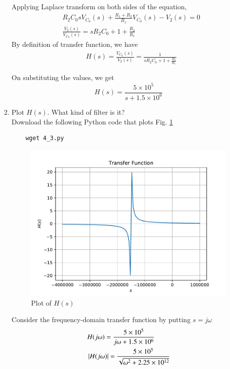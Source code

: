 \documentclass[journal,12pt,twocolumn]{IEEEtran}
\renewcommand\thesection{\arabic{section}}
\begin{document}
\begin{enumerate}[label=\arabic*.,ref=\thesection.\theenumi]
Applying Laplace transform on both sides of the equation, 
\begin{align}
	&R_2 C_0 s V_{C_0}(s) + \frac{R_1 + R_2}{R_1} V_{C_0}(s) - V_2(s) = 0 \\
	&\frac{V_2(s)}{V_{C_0}(s)} =s R_2 C_0 + 1 + \frac{R_2}{R_1}
\end{align}
By definition of transfer function, we have 
\begin{align}
	&H(s) = \frac{V_{C_0}(s)}{V_2(s)} = \frac{1}{s R_2 C_0 + 1 + \frac{R_2}{R_1}}
	\label{eq:H_s}
\end{align}

On substituting the values, we get
\begin{equation}
	H(s) = \frac{5 \times 10^5}{s + 1.5 \times 10^6}
\end{equation}


\item Plot $H(s)$.  What kind of filter is it? \\

\solution Download the following Python code that plots Fig. \ref{fig-4.3}
\begin{lstlisting}
	wget 4_3.py
\end{lstlisting}

\begin{figure}[!ht]
\centering
\includegraphics[width=\columnwidth]{./figs/4_3.pdf}
\caption{Plot of $H(s)$}
\label{fig-4.3}	
\end{figure}

Consider the frequency-domain transfer function by putting $s = j\omega$
\begin{align}
	&H(j\omega) = \frac{5 \times 10^5}{j\omega + 1.5 \times 10^6} \\
	&\left\vert H(j\omega)\right\vert = \frac{5 \times 10^5}{\sqrt{\omega^2 + 2.25\times10^{12}}}
\end{align}
	

\end{enumerate}
\end{document}
